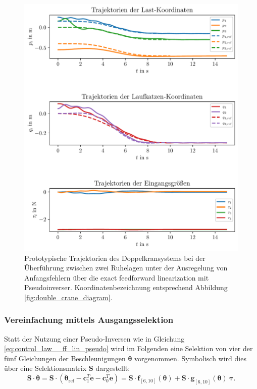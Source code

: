 \begin{figure}[H]
	\begin{center}
		\includegraphics[scale=1]{Pictures/feedforward_lin_pseudo_controller_initial_error}
	\end{center}
	\caption[Trajektorien Ruhelagenüberführung mit Regelung über exact feedforward linearization (Pseudoinverse)]
	{Prototypische Trajektorien des Doppelkransystems bei der Überführung zwischen zwei Ruhelagen unter der Ausregelung von Anfangsfehlern über die exact feedforward linearization mit Pseudoinverser. Koordinatenbezeichnung entsprechend Abbildung \ref{fig:double_crane_diagram}.}
	\label{fig_feedforward_pseudo_controller_initial_error}
\end{figure}

\subsubsection{Vereinfachung mittels Ausgangsselektion}
Statt der Nutzung einer Pseudo-Inversen wie in Gleichung \eqref{eq:control_law__ff_lin_pseudo} wird im Folgenden eine Selektion von vier der fünf Gleichungen der Beschleunigungen $\ddot{\boldsymbol{\theta}}$ vorgenommen. Symbolisch wird dies über eine Selektionsmatrix $\mathbf{S}$ dargestellt:
\begin{equation}
	\mathbf{S} \cdot \ddot{\boldsymbol{\theta}} = \mathbf{S} \cdot (\ddot{\boldsymbol{\theta}}_{\text{ref}} - \mathbf{c}_1^T \dot{\mathbf{e}} - \mathbf{c}_0^T \mathbf{e}) = \mathbf{S} \cdot \mathbf{f}_{[6, 10]}(\boldsymbol{\theta}) + \mathbf{S} \cdot \mathbf{g}_{[6, 10]}(\boldsymbol{\theta}) \ \boldsymbol{\tau}.
\end{equation} 

